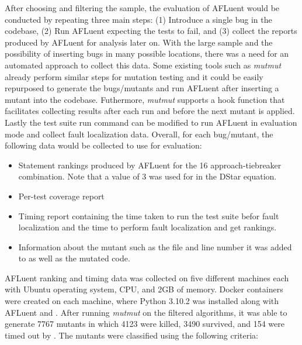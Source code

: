 After choosing and filtering the sample, the evaluation of AFLuent would be
conducted by repeating three main steps: (1) Introduce a single bug in the codebase,
(2) Run AFLuent expecting the tests to fail, and (3) collect the reports
produced by AFLuent for analysis later on. With the large sample and the
possibility of inserting bugs in many possible locations, there was a need for
an automated approach to collect this data. Some existing tools such as
\emph{mutmut} \cite{mutmut} already perform similar steps for
mutation testing and it could be easily repurposed to generate the bugs/mutants and run
AFLuent after inserting a mutant into the codebase. Futhermore, \emph{mutmut}
supports a hook function that facilitates collecting results after each run and
before the next mutant is applied. Lastly the test suite run command can be
modified to run AFLuent in evaluation mode and collect fault localization data.
Overall, for each bug/mutant, the following data would be collected to use for
evaluation:
\begin{itemize}
    \item Statement rankings produced by AFLuent for the 16
    approach-tiebreaker combination. Note that a value of 3 was used for \code{*} in
    the DStar equation.
    \item Per-test coverage report
    \item Timing report containing the time taken to run the test suite befor
    fault localization and the time to perform fault localization and get
    rankings.
    \item Information about the mutant such as the file and line number it was
    added to as well as the mutated code.
\end{itemize}

AFLuent ranking and timing data was collected on five different machines each with
Ubuntu operating system,  CPU, and 2GB of memory. Docker containers were created
on each machine, where Python 3.10.2 was installed along with AFLuent and
. After running \emph{mutmut} on the filtered algorithms, it was able
to generate 7767 mutants in which 4123 were killed, 3490 survived, and 154 were
timed out by . The mutants were classified using the following criteria:

